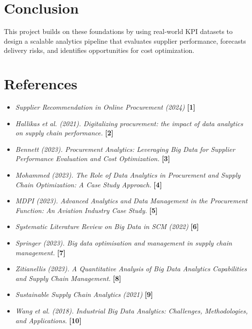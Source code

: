 \documentclass[10pt, onecolumn]{article}
\begin{document}
\section{\textbf{Conclusion}}
This project builds on these foundations by using real-world KPI datasets to design a scalable analytics pipeline that evaluates supplier performance, forecasts delivery risks, and identifies opportunities for cost optimization.

\section{References}

\begin{itemize}
  \item \textit{Supplier Recommendation in Online Procurement (2024)} \textbf{[1]}
  \item \textit{Hallikas et al. (2021). Digitalizing procurement: the impact of data analytics on supply chain performance.} \textbf{[2]}
  \item \textit{Bennett (2023). Procurement Analytics: Leveraging Big Data for Supplier Performance Evaluation and Cost Optimization.} \textbf{[3]}
  \item \textit{Mohammed (2023). The Role of Data Analytics in Procurement and Supply Chain Optimization: A Case Study Approach.} \textbf{[4]}
  \item \textit{MDPI (2023). Advanced Analytics and Data Management in the Procurement Function: An Aviation Industry Case Study.} \textbf{[5]}
  \item \textit{Systematic Literature Review on Big Data in SCM (2022)} \textbf{[6]}
  \item \textit{Springer (2023). Big data optimisation and management in supply chain management.} \textbf{[7]}
  \item \textit{Zitianellis (2023). A Quantitative Analysis of Big Data Analytics Capabilities and Supply Chain Management.} \textbf{[8]}
  \item \textit{Sustainable Supply Chain Analytics (2021)} \textbf{[9]}
  \item \textit{Wang et al. (2018). Industrial Big Data Analytics: Challenges, Methodologies, and Applications.} \textbf{[10]}
\end{itemize}
 
\end{document}
